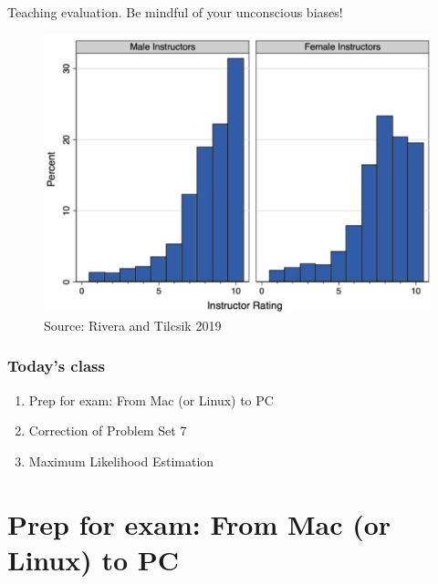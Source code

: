 \documentclass[xcolor=table,dvipsnames]{beamer}
\begin{document}
\begin{frame}{Teaching evaluation. Be mindful of your unconscious biases!}
\centering
\begin{figure}
\includegraphics[scale=0.45]{pictures/week24_gender.png}
\caption{Source: Rivera and Tilcsik 2019}
\end{figure}
\end{frame}

\begin{frame}
\frametitle{Today's class}
\begin{enumerate}
\item Prep for exam: From Mac (or Linux) to PC
\item Correction of Problem Set 7
\item Maximum Likelihood Estimation
\end{enumerate}
\end{frame}

\section{Prep for exam: From Mac (or Linux) to PC}
\end{document}
